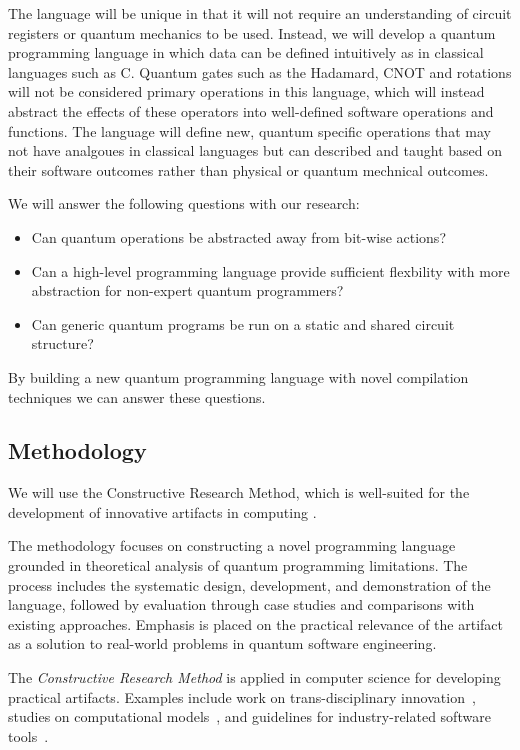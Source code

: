 \documentclass[journal,onecolumn, compsoc]{IEEEtran}
\begin{document}
The language will be unique in that it will not require an understanding of circuit registers or quantum mechanics to be used.
Instead, we will develop a quantum programming language in which data can be defined intuitively as in classical languages such as C.
Quantum gates such as the Hadamard, CNOT and rotations will not be considered primary operations in this language, which will instead abstract the effects of these operators into well-defined software operations and functions.
The language will define new, quantum specific operations that may not have analgoues in classical languages but can described and taught based on their software outcomes rather than physical or quantum mechnical outcomes.

We will answer the following questions with our research:
\begin{itemize}
    \item Can quantum operations be abstracted away from bit-wise actions?
    \item Can a high-level programming language provide sufficient flexbility with more abstraction for non-expert quantum programmers?
    \item Can generic quantum programs be run on a static and shared circuit structure?
\end{itemize}

By building a new quantum programming language with novel compilation techniques we can answer these questions.

\subsection{Methodology}
We will use the Constructive Research Method, which is well-suited for the development of innovative artifacts in computing \cite{lukka2003constructive}. 

The methodology focuses on constructing a novel programming language grounded in theoretical analysis of quantum programming limitations. 
The process includes the systematic design, development, and demonstration of the language, followed by evaluation through case studies and comparisons with existing approaches. 
Emphasis is placed on the practical relevance of the artifact as a solution to real-world problems in quantum software engineering.

The \textit{Constructive Research Method} is applied in computer science for developing practical artifacts. Examples include work on trans-disciplinary innovation~\cite{mcgregor2018}, studies on computational models~\cite{dodig2010}, and guidelines for industry-related software tools~\cite{lassenius2001}.
\end{document}
